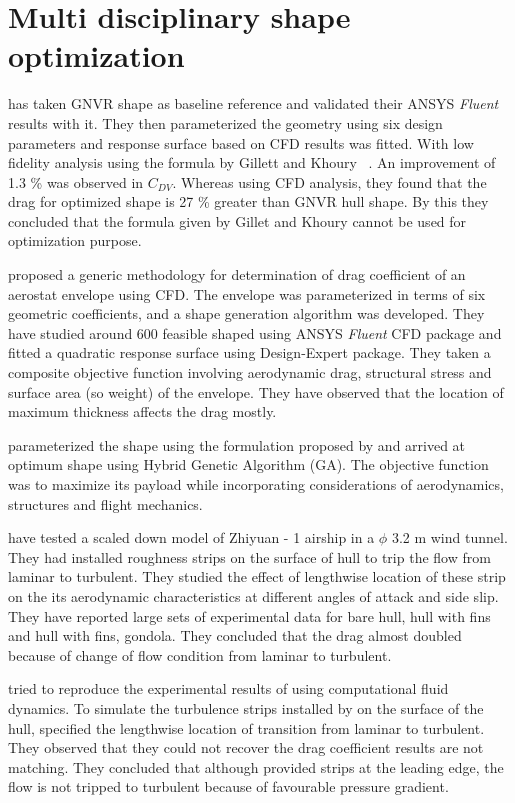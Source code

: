  \section{Multi disciplinary shape optimization}
\cite{kanikdale2004multi} has taken GNVR shape   as baseline reference and validated their ANSYS\textsuperscript{\textregistered} \textit{Fluent} results with it. They then parameterized the geometry using six design parameters and response surface based on CFD results was fitted. With low fidelity analysis using the formula by Gillett and Khoury ~. An improvement of 1.3 \% was observed in $ C_{DV} $. Whereas using CFD analysis, they found that the drag for optimized shape is 27 \% greater than GNVR hull shape. By this they concluded that the formula given by Gillet and Khoury cannot be used for optimization purpose.

\cite{Kale2005a} proposed a generic methodology for determination of drag coefficient of an aerostat envelope using CFD. The envelope was parameterized in terms of six geometric coefficients, and a shape generation algorithm was developed. They have studied around 600 feasible shaped using ANSYS\textsuperscript{\textregistered} \textit{Fluent} CFD package and fitted a quadratic response surface using Design-Expert package. They taken a composite objective function involving aerodynamic drag, structural stress and surface area (so weight) of the envelope. They have observed that the location of maximum thickness affects the drag mostly. 

\cite{Ram2010} parameterized the shape using the formulation proposed by \cite{kanikdale2004multi} and arrived at optimum shape using Hybrid Genetic Algorithm (GA). The objective function was to maximize its payload while incorporating considerations of aerodynamics, structures and flight mechanics.

\cite{Wang2010} have tested a scaled down model of Zhiyuan - 1 airship in a $\phi $ 3.2 m wind tunnel. They had installed roughness strips on the surface of hull to trip the flow from laminar to turbulent. They studied the effect of lengthwise location of these strip on the its aerodynamic characteristics at different angles of attack and side slip. They have reported large sets of experimental data for bare hull, hull with fins and hull with fins, gondola. They concluded  that the drag almost doubled because of change of flow condition from laminar to turbulent.

\cite{Suman2011} tried to reproduce the experimental results of \cite{Wang2010} using computational fluid dynamics. To simulate the turbulence strips installed by  \cite{Wang2010} on the surface of the hull, \cite{Suman2011} specified the lengthwise location of transition from laminar to turbulent. They observed that they could not recover the drag coefficient  results are not matching. They concluded that although \cite{Wang2010} provided strips at the leading edge, the flow is not tripped to turbulent because of favourable pressure gradient.

